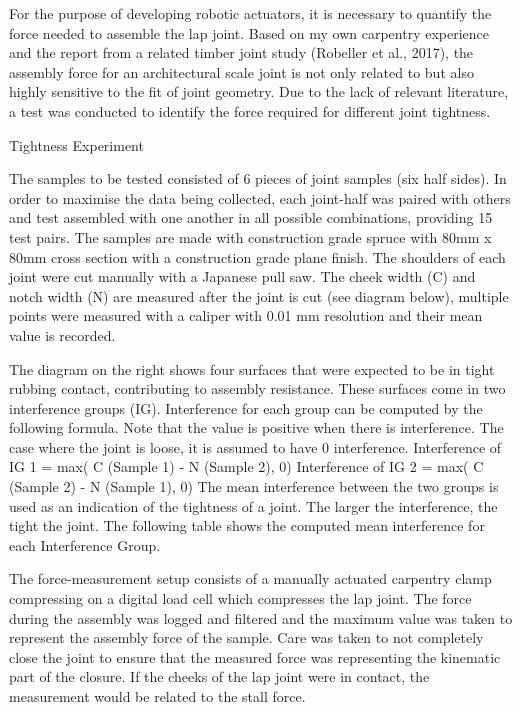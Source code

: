 For the purpose of developing robotic actuators, it is necessary to quantify the force needed to assemble the lap joint. Based on my own carpentry experience and the report from a related timber joint study (Robeller et al., 2017), the assembly force for an architectural scale joint is not only related to but also highly sensitive to the fit of joint geometry. 
Due to the lack of relevant literature, a test was conducted to identify the force required for different joint tightness.

Tightness Experiment

The samples to be tested consisted of 6 pieces of joint samples (six half sides). In order to maximise the data being collected, each joint-half was paired with others and test assembled with one another in all possible combinations, providing 15 test pairs.
The samples are made with construction grade spruce with 80mm x 80mm cross section with a construction grade plane finish. The shoulders of each joint were cut manually with a Japanese pull saw. The cheek width (C) and notch width (N) are measured after the joint is cut (see diagram below), multiple points were measured with a caliper with 0.01 mm resolution and their mean value is recorded.

The diagram on the right shows four surfaces that were expected to be in tight rubbing contact, contributing to assembly resistance. These surfaces come in two interference groups (IG). Interference for each group can be computed by the following formula. Note that the value is positive when there is interference. The case where the joint is loose, it is assumed to have 0 interference. 
Interference of IG 1 = max( C (Sample 1) - N (Sample 2), 0)
Interference of IG 2 = max( C (Sample 2) - N (Sample 1), 0)
The mean interference between the two groups is used as an indication of the tightness of a joint. The larger the interference, the tight the joint. The following table shows the computed mean interference for each Interference Group.

The force-measurement setup consists of a manually actuated carpentry clamp compressing on a digital load cell which compresses the lap joint. The force during the assembly was logged and filtered and the maximum value was taken to represent the assembly force of the sample. Care was taken to not completely close the joint to ensure that the measured force was representing the kinematic part of the closure. If the cheeks of the lap joint were in contact, the measurement would be related to the stall force.

